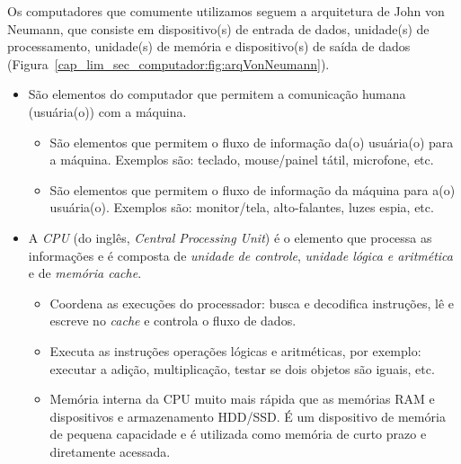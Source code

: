 Os computadores que comumente utilizamos seguem a arquitetura de John von Neumann{\vonNeumann}, que consiste em dispositivo(s) de entrada de dados, unidade(s) de processamento, unidade(s) de memória e dispositivo(s) de saída de dados (Figura~\ref{cap_lim_sec_computador:fig:arqVonNeumann}).

\ifisbook
\newpage
\fi

\begin{itemize}
\item {}

  São elementos do computador que permitem a comunicação humana (usuária(o)) com a máquina.

  \begin{itemize}
  \item {}

    São elementos que permitem o fluxo de informação da(o) usuária(o) para a máquina. Exemplos são: teclado, mouse/painel tátil, microfone, etc.

  \item {}

    São elementos que permitem o fluxo de informação da máquina para a(o) usuária(o). Exemplos são: monitor/tela, alto-falantes, luzes espia, etc.
  \end{itemize}

\item {}

  A \emph{CPU} (do inglês, \textit{Central Processing Unit}) é o elemento que processa as informações e é composta de \emph{unidade de controle}, \emph{unidade lógica e aritmética} e de \emph{memória cache}.

  \begin{itemize}
  \item {}

    Coordena as execuções do processador: busca e decodifica instruções, lê e escreve no \textit{cache} e controla o fluxo de dados.

  \item {}

    Executa as instruções operações lógicas e aritméticas, por exemplo: executar a adição, multiplicação, testar se dois objetos são iguais, etc.

  \item {}

    Memória interna da CPU muito mais rápida que as memórias RAM e dispositivos e armazenamento HDD/SSD. É um dispositivo de memória de pequena capacidade e é utilizada como memória de curto prazo e diretamente acessada.
  \end{itemize}


\end{itemize}
